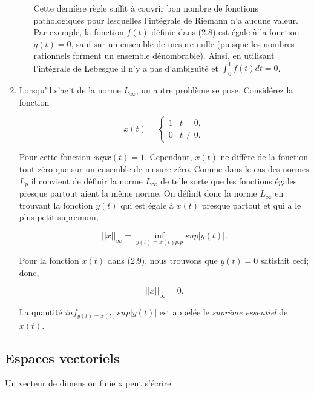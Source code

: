 \documentclass[10pt,twoside,a4paper]{book}
\begin{document}
\begin{enumerate}
\begin{enumerate}
    \noindent
    Cette dernière règle suffit à couvrir bon nombre de fonctions pathologiques pour lesquelles l'intégrale de Riemann n'a aucune valeur. Par exemple, la fonction $f(t)$ définie dans (2.8) est égale à la fonction $g(t) = 0$, sauf sur un ensemble de mesure nulle (puisque les nombres rationnels forment un ensemble dénombrable). 
    Ainsi, en utilisant l'intégrale de Lebesgue il n'y a pas d'ambiguïté et $\int_{0}^{1}f(t)dt = 0$.
  \end{enumerate}

  \item Lorsqu'il s'agit de la norme $L_\infty$, un autre problème se pose. Considérez la fonction
  
  \begin{equation}
    x(t) = \begin{cases} 1 & t = 0, \\
      0 &  t \neq 0.
          \end{cases}
  \end{equation}

  \noindent
  Pour cette fonction $sup x(t) = 1$. Cependant, $x(t)$ ne diffère de la fonction tout zéro que sur un ensemble de mesure zéro. Comme dans le cas des normes $L_p$ il convient de définir la norme $L_\infty$ de telle sorte que les fonctions égales presque partout aient la même norme. 
  On définit donc la norme $L_\infty$ en trouvant la fonction $y(t)$ qui est égale à $x(t)$ presque partout et qui a le plus petit supremum,

  \begin{equation*}
    ||x||_{\infty} = \inf_{y(t)=x(t) p.p} sup |y(t)|.
  \end{equation*}

  \noindent
  Pour la fonction $x(t)$ dans (2.9), nous trouvons que $y(t) = 0$ satisfait ceci; donc,

  \begin{equation*}
    ||x||_{\infty} = 0.
  \end{equation*}

  \noindent
  La quantité $inf_{y(t)=x(t)} sup |y(t)|$ est appelée le \textit{suprême essentiel} de $x(t)$.
\end{enumerate}

\subsection{Espaces vectoriels}

\noindent
Un vecteur de dimension finie x peut s'écrire
\end{document}
